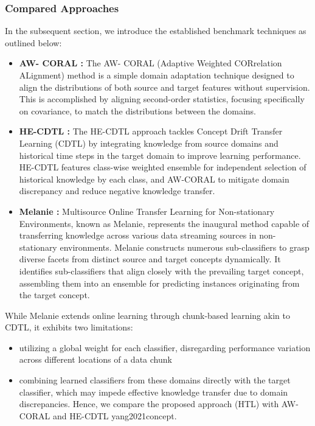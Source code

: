   \subsubsection{Compared Approaches}
  In the subsequent section, we introduce the established benchmark techniques as outlined below:
  \begin{itemize}
    \item \textbf{AW- CORAL \cite{sun2016return}:} The AW- CORAL (Adaptive Weighted CORrelation ALignment) method is a simple domain adaptation technique designed to align the distributions of both source and target features without supervision. This is accomplished by aligning second-order statistics, focusing specifically on covariance, to match the distributions between the domains.
    \item \textbf{HE-CDTL \cite{sun2016return}:} The HE-CDTL approach tackles Concept Drift Transfer Learning (CDTL) by integrating knowledge from source domains and historical time steps in the target domain to improve learning performance. HE-CDTL features class-wise weighted ensemble for independent selection of historical knowledge by each class, and AW-CORAL to mitigate domain discrepancy and reduce negative knowledge transfer.
    \item \textbf{Melanie \cite{dong2019multistream}:} Multisource Online Transfer Learning for Non-stationary Environments, known as Melanie, represents the inaugural method capable of transferring knowledge across various data streaming sources in non-stationary environments. Melanie constructs numerous sub-classifiers to grasp diverse facets from distinct source and target concepts dynamically. It identifies sub-classifiers that align closely with the prevailing target concept, assembling them into an ensemble for predicting instances originating from the target concept.
  \end{itemize}

While Melanie extends online learning through chunk-based learning akin to CDTL, it exhibits two limitations: 
\begin{itemize}
  \item utilizing a global weight for each classifier, disregarding performance variation across different locations of a data chunk
  \item combining learned classifiers from these domains directly with the target classifier, which may impede effective knowledge transfer due to domain discrepancies. Hence, we compare the proposed approach (HTL) with AW- CORAL \cite{sun2016return} and HE-CDTL yang2021concept.
\end{itemize}

